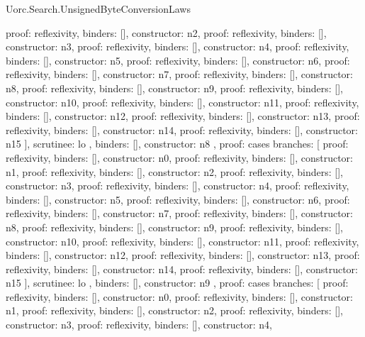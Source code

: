 \begin{lexlean}{Uorc.Search.UnsignedByteConversionLaws}
\begin{semanticmodule}
{{{{            {proof: reflexivity{}, binders: [], constructor: n2},
            {proof: reflexivity{}, binders: [], constructor: n3},
            {proof: reflexivity{}, binders: [], constructor: n4},
            {proof: reflexivity{}, binders: [], constructor: n5},
            {proof: reflexivity{}, binders: [], constructor: n6},
            {proof: reflexivity{}, binders: [], constructor: n7},
            {proof: reflexivity{}, binders: [], constructor: n8},
            {proof: reflexivity{}, binders: [], constructor: n9},
            {proof: reflexivity{}, binders: [], constructor: n10},
            {proof: reflexivity{}, binders: [], constructor: n11},
            {proof: reflexivity{}, binders: [], constructor: n12},
            {proof: reflexivity{}, binders: [], constructor: n13},
            {proof: reflexivity{}, binders: [], constructor: n14},
            {proof: reflexivity{}, binders: [], constructor: n15}
          ],
          scrutinee: lo
        },
        binders: [],
        constructor: n8
      },
      {
        proof: cases{
          branches: [
            {proof: reflexivity{}, binders: [], constructor: n0},
            {proof: reflexivity{}, binders: [], constructor: n1},
            {proof: reflexivity{}, binders: [], constructor: n2},
            {proof: reflexivity{}, binders: [], constructor: n3},
            {proof: reflexivity{}, binders: [], constructor: n4},
            {proof: reflexivity{}, binders: [], constructor: n5},
            {proof: reflexivity{}, binders: [], constructor: n6},
            {proof: reflexivity{}, binders: [], constructor: n7},
            {proof: reflexivity{}, binders: [], constructor: n8},
            {proof: reflexivity{}, binders: [], constructor: n9},
            {proof: reflexivity{}, binders: [], constructor: n10},
            {proof: reflexivity{}, binders: [], constructor: n11},
            {proof: reflexivity{}, binders: [], constructor: n12},
            {proof: reflexivity{}, binders: [], constructor: n13},
            {proof: reflexivity{}, binders: [], constructor: n14},
            {proof: reflexivity{}, binders: [], constructor: n15}
          ],
          scrutinee: lo
        },
        binders: [],
        constructor: n9
      },
      {
        proof: cases{
          branches: [
            {proof: reflexivity{}, binders: [], constructor: n0},
            {proof: reflexivity{}, binders: [], constructor: n1},
            {proof: reflexivity{}, binders: [], constructor: n2},
            {proof: reflexivity{}, binders: [], constructor: n3},
            {proof: reflexivity{}, binders: [], constructor: n4},
}}}}
\end{semanticmodule}
\end{lexlean}

